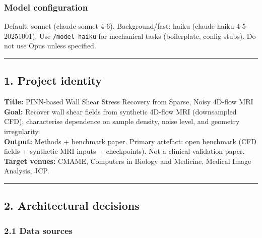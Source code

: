\documentclass[
]{article}
\begin{document}
\subsubsection{Model configuration}\label{model-configuration}

Default: sonnet (claude-sonnet-4-6). Background/fast: haiku
(claude-haiku-4-5-20251001). Use \texttt{/model\ haiku} for mechanical
tasks (boilerplate, config stubs). Do not use Opus unless specified.

\begin{center}\rule{0.5\linewidth}{0.5pt}\end{center}

\subsection{1. Project identity}\label{project-identity}

\textbf{Title:} PINN-based Wall Shear Stress Recovery from Sparse, Noisy
4D-flow MRI\\
\textbf{Goal:} Recover wall shear fields from synthetic 4D-flow MRI
(downsampled CFD); characterise dependence on sample density, noise
level, and geometry irregularity.\\
\textbf{Output:} Methods + benchmark paper. Primary artefact: open
benchmark (CFD fields + synthetic MRI inputs + checkpoints). Not a
clinical validation paper.\\
\textbf{Target venues:} CMAME, Computers in Biology and Medicine,
Medical Image Analysis, JCP.

\begin{center}\rule{0.5\linewidth}{0.5pt}\end{center}

\subsection{2. Architectural decisions}\label{architectural-decisions}

\subsubsection{2.1 Data sources}\label{data-sources}
\end{document}
